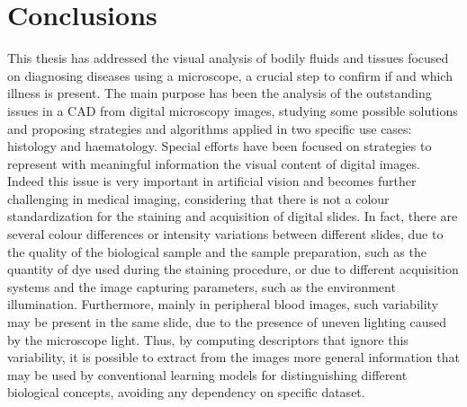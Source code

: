 \documentclass[final,a4paper,12pt,english]{UnicaPhdThesis3}
\begin{document}
\chapter*{Conclusions} \label{quattro}
This thesis has addressed the visual analysis of bodily fluids and tissues focused on diagnosing diseases using a microscope, a crucial step to confirm if and which illness is present. The main purpose has been the analysis of the outstanding issues in a CAD from digital microscopy images, studying some possible solutions and proposing strategies and algorithms applied in two specific use cases: histology and haematology. Special efforts have been focused on strategies to represent with meaningful information the visual content of digital images. Indeed this issue is very important in artificial vision and becomes further challenging in medical imaging, considering that there is not a colour standardization for the staining and acquisition of digital slides. In fact, there are several colour differences or intensity variations between different slides, due to the quality of the biological sample and the sample preparation, such as the quantity of dye used during the staining procedure, or due to different acquisition systems and the image capturing parameters, such as the environment illumination. Furthermore, mainly in peripheral blood images, such variability may be present in the same slide, due to the presence of uneven lighting caused by the microscope light. Thus, by computing descriptors that ignore this variability, it is possible to extract from the images more general information that may be used by conventional learning models for distinguishing different biological concepts, avoiding any dependency on specific dataset. 
\end{document}
